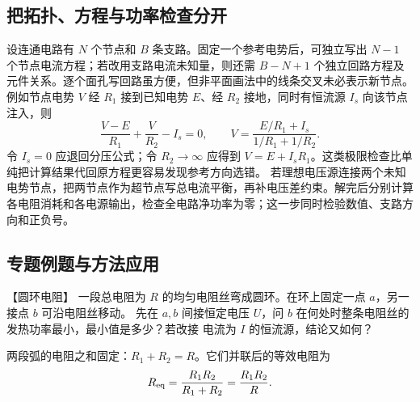 {%
\subsection{把拓扑、方程与功率检查分开}
设连通电路有 $N$ 个节点和 $B$ 条支路。固定一个参考电势后，可独立写出 $N-1$ 个节点电流方程；若改用支路电流未知量，则还需 $B-N+1$ 个独立回路方程及元件关系。逐个面孔写回路虽方便，但非平面画法中的线条交叉未必表示新节点。
例如节点电势 $V$ 经 $R_1$ 接到已知电势 $E$、经 $R_2$ 接地，同时有恒流源 $I_s$ 向该节点注入，则
\[
 \frac{V-E}{R_1}+\frac V{R_2}-I_s=0,
 \qquad V=\frac{E/R_1+I_s}{1/R_1+1/R_2}.
\]
令 $I_s=0$ 应退回分压公式；令 $R_2\to\infty$ 应得到 $V=E+I_sR_1$。这类极限检查比单纯把计算结果代回原方程更容易发现参考方向选错。
若理想电压源连接两个未知电势节点，把两节点作为超节点写总电流平衡，再补电压差约束。解完后分别计算各电阻消耗和各电源输出，检查全电路净功率为零；这一步同时检验数值、支路方向和正负号。


\subsection{专题例题与方法应用}

\begin{origexamplebox}{【圆环电阻】}\label{ch21:ex:s36-5-7}
一段总电阻为 $R$ 的均匀电阻丝弯成圆环。在环上固定一点 $a$，另一接点 $b$ 可沿电阻丝移动。
先在 $a,b$ 间接恒定电压 $U$，问 $b$ 在何处时整条电阻丝的发热功率最小，最小值是多少？若改接
电流为 $I$ 的恒流源，结论又如何？
\par\noindent\begin{minipage}{\linewidth}
\emRingResistorQuestion
{}
\end{minipage}\par\medskip
\end{origexamplebox}
\begin{xesolution}\par\nopagebreak[4]

\par\noindent\begin{minipage}{\linewidth}
\ringResistorFigure
{}
\end{minipage}\par\medskip


两段弧的电阻之和固定：$R_1+R_2=R$。它们并联后的等效电阻为
\[
  R_{\rm eq}=\frac{R_1R_2}{R_1+R_2}=\frac{R_1R_2}{R}.
\]


\end{xesolution}}
